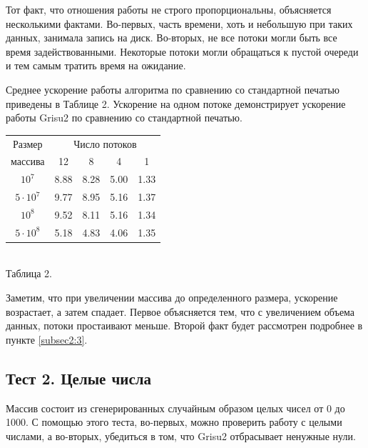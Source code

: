 Тот факт, что отношения работы не строго пропорциональны, объясняется несколькими фактами.
Во-первых, часть времени, хоть и небольшую при таких данных, занимала запись на диск.
Во-вторых, не все потоки могли быть все время задействованными.
Некоторые потоки могли обращаться к пустой очереди и тем самым тратить время на ожидание.

Среднее ускорение работы алгоритма по сравнению со стандартной печатью приведены в Таблице 2.
Ускорение на одном потоке демонстрирует ускорение работы \textsf{Grisu2} по сравнению со стандартной печатью.
\begin{center}
\begin{tabular}{||c|c|c|c|c||}
\hline
\hline
Размер & \multicolumn{4}{c||}{Число потоков}\\
\hhline{~|-|-|-|-|}
массива & 12 & 8 & 4 & 1 \\
\hline
$10^7$ &  8.88 & 8.28 & 5.00 & 1.33 \\
\hline
$5 \cdot 10^7$ & 9.77& 8.95 & 5.16 & 1.37 \\
\hline
$10^8$ & 9.52 & 8.11 & 5.16 & 1.34\\
\hline
$5 \cdot 10^8$ & 5.18 & 4.83 & 4.06 & 1.35\\
\hline
\hline
\end{tabular}
\\
\vspace{14pt}
\small{Таблица 2.}
\end{center}

Заметим, что при увеличении массива до определенного размера, ускорение возрастает, а затем спадает.
Первое объясняется тем, что с увеличением объема данных, потоки простаивают меньше.
Второй факт будет рассмотрен подробнее в пункте \ref{subsec2:3}.

\subsection{Тест 2. Целые числа} \label{test2}
Массив состоит из сгенерированных случайным образом целых чисел от 0 до 1000.
С помощью этого теста, во-первых, можно проверить работу с целыми числами, а во-вторых, убедиться в том, что \textsf{Grisu2} отбрасывает ненужные нули.

